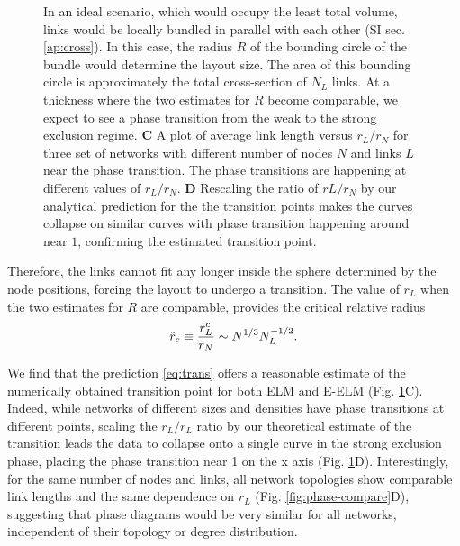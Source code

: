 \documentclass[nofootinbib,preprint,floatfix,titlepage,endfloats]{revtex4} %
\begin{document}
\begin{figure}
{    In an ideal scenario, which would occupy the least total volume, links would be locally bundled in parallel with each other (SI sec. \ref{ap:cross}). 
    In this case, the radius $R$ of the bounding circle of the bundle would determine the layout size.
    The area of this bounding circle is approximately the total cross-section of $N_L$ links. 
    At a thickness where the two estimates for $R$ become comparable, we expect to see a phase transition from the weak to the strong exclusion regime. 
    {\bf C} A plot of average link length versus $r_L/r_N$ for three set of networks with different number of nodes $N$ and links $L$ near the phase transition. The phase transitions are happening at different values of $r_L/r_N$. 
    {\bf D} Rescaling the ratio of $rL/r_N$ by our analytical prediction for the the transition points makes the curves collapse on similar curves with phase transition happening around near $1$, confirming the estimated transition point. }
    \label{fig:trans}
\end{figure}
Therefore, the links cannot fit any longer inside the sphere determined by the node positions, forcing the layout to undergo a transition. The value of $r_L$ when the two estimates for $R$ are comparable, provides the critical relative radius 
\begin{equation}
    \tilde{r}_c \equiv {r^c_L\over r_N} \sim N^{1/3} N_L^{-1/2}. \label{eq:trans}
\end{equation}

We find that the prediction \eqref{eq:trans} offers a reasonable estimate of the numerically obtained transition point for both ELM and E-ELM (Fig. \ref{fig:trans}C). Indeed, while networks of different sizes and densities have phase transitions at different points, scaling the $r_L/r_L$ ratio by our theoretical estimate of the transition leads the data to collapse onto a single curve in the strong exclusion phase, placing the phase transition near 1 on the x axis (Fig. \ref{fig:trans}D).     
Interestingly, for the same number of nodes and links, all network topologies show comparable link lengths and the same dependence on $r_L$ (Fig. \ref{fig:phase-compare}D), 
suggesting that phase diagrams would be very similar for all networks, independent of their topology or degree distribution.
\end{document}
